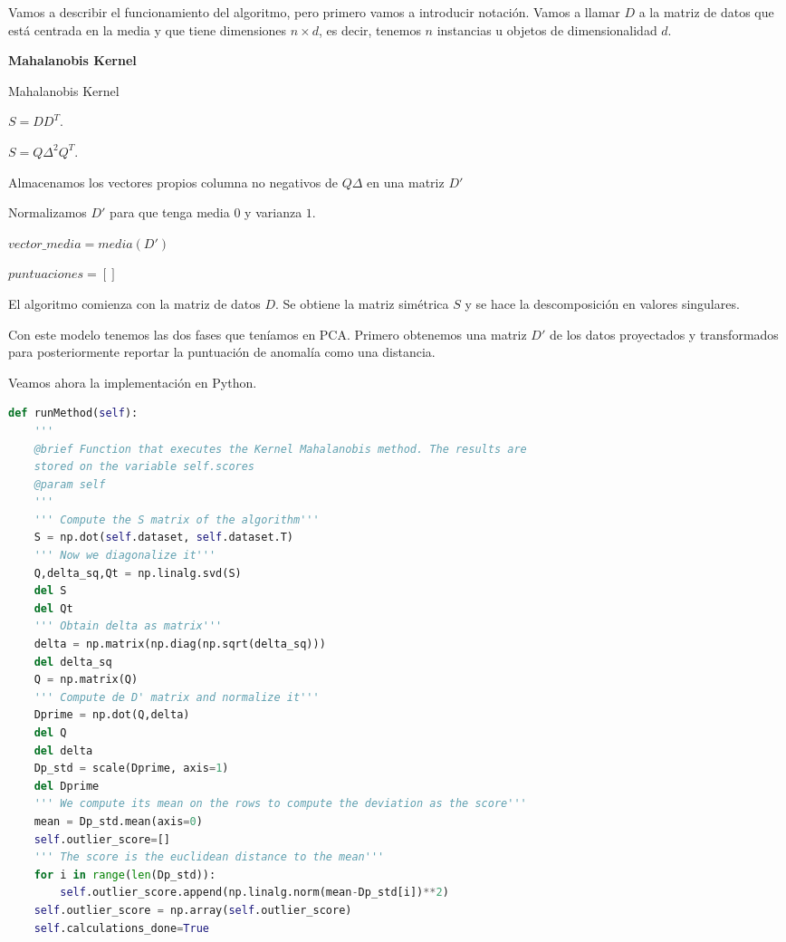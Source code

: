 Vamos a describir el funcionamiento del algoritmo, pero primero vamos a introducir notación. Vamos a llamar $D$ a la matriz de datos que está centrada en la media y que tiene dimensiones $n\times d$, es decir, tenemos $n$ instancias u objetos de dimensionalidad $d$.

\begin{algorithm}[H]{\textbf{Mahalanobis Kernel}}
	\caption{Mahalanobis Kernel}
	\label{mahalanobis_kernel}
	
	$S = DD^T$.
	
	$S = Q\Delta^2 Q^T$.
	
	Almacenamos los vectores propios columna no negativos de $Q\Delta$ en una matriz $D'$
	
	Normalizamos $D'$ para que tenga media $0$ y varianza $1$.
	
	$vector\_media = media(D')$
	
	$puntuaciones = []$
	
\end{algorithm}

El algoritmo comienza con la matriz de datos $D$. Se obtiene la matriz simétrica $S$ y se hace la descomposición en valores singulares. 

Con este modelo tenemos las dos fases que teníamos en PCA. Primero obtenemos una matriz $D'$ de los datos proyectados y transformados para posteriormente reportar la puntuación de anomalía como una distancia.

Veamos ahora la implementación en Python.

\begin{lstlisting}[language=Python]
def runMethod(self):
	'''
	@brief Function that executes the Kernel Mahalanobis method. The results are
	stored on the variable self.scores
	@param self
	'''
	''' Compute the S matrix of the algorithm'''
	S = np.dot(self.dataset, self.dataset.T)
	''' Now we diagonalize it'''
	Q,delta_sq,Qt = np.linalg.svd(S)
	del S
	del Qt
	''' Obtain delta as matrix'''
	delta = np.matrix(np.diag(np.sqrt(delta_sq)))
	del delta_sq
	Q = np.matrix(Q)
	''' Compute de D' matrix and normalize it'''
	Dprime = np.dot(Q,delta)
	del Q
	del delta
	Dp_std = scale(Dprime, axis=1)
	del Dprime
	''' We compute its mean on the rows to compute the deviation as the score'''
	mean = Dp_std.mean(axis=0)
	self.outlier_score=[]
	''' The score is the euclidean distance to the mean'''
	for i in range(len(Dp_std)):
		self.outlier_score.append(np.linalg.norm(mean-Dp_std[i])**2)
	self.outlier_score = np.array(self.outlier_score)
	self.calculations_done=True
\end{lstlisting}

